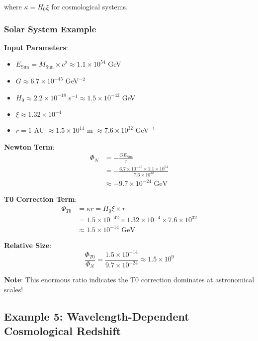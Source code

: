 \documentclass[12pt,a4paper]{article}
\newcommand{\xipar}{\xi}
\begin{document}
	where $\kappa = H_0 \xipar$ for cosmological systems.
	
	\subsubsection{Solar System Example}
	
	\textbf{Input Parameters}:
	\begin{itemize}
		\item $E_{\text{Sun}} = M_{\text{Sun}} \times c^2 \approx 1.1 \times 10^{54}$ GeV
		\item $G \approx 6.7 \times 10^{-45}$ GeV$^{-2}$
		\item $H_0 \approx 2.2 \times 10^{-18}$ s$^{-1} \approx 1.5 \times 10^{-42}$ GeV
		\item $\xipar \approx 1.32 \times 10^{-4}$
		\item $r = 1$ AU $\approx 1.5 \times 10^{11}$ m $\approx 7.6 \times 10^{32}$ GeV$^{-1}$
	\end{itemize}
	
	\textbf{Newton Term}:
	\begin{align}
		\Phi_N &= -\frac{GE_{\text{Sun}}}{r} \\
		&= -\frac{6.7 \times 10^{-45} \times 1.1 \times 10^{54}}{7.6 \times 10^{32}} \\
		&\approx -9.7 \times 10^{-24} \text{ GeV}
		\label{eq:newton_term_calculation}
	\end{align}
	
	\textbf{T0 Correction Term}:
	\begin{align}
		\Phi_{T0} &= \kappa r = H_0 \xipar \times r \\
		&= 1.5 \times 10^{-42} \times 1.32 \times 10^{-4} \times 7.6 \times 10^{32} \\
		&\approx 1.5 \times 10^{-14} \text{ GeV}
		\label{eq:t0_term_calculation}
	\end{align}
	
	\textbf{Relative Size}:
	\begin{equation}
		\frac{\Phi_{T0}}{\Phi_N} = \frac{1.5 \times 10^{-14}}{9.7 \times 10^{-24}} \approx 1.5 \times 10^{9}
		\label{eq:relative_correction}
	\end{equation}
	
	\textbf{Note}: This enormous ratio indicates the T0 correction dominates at astronomical scales!
	
	\subsection{Example 5: Wavelength-Dependent Cosmological Redshift}
	\label{subsec:cosmological_redshift_energy}
	
\end{document}
